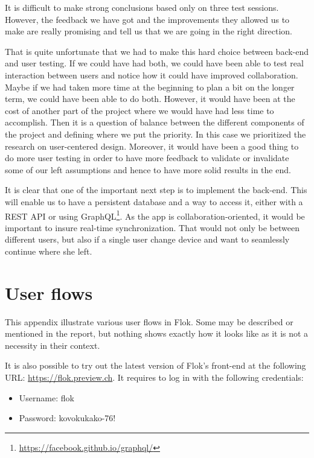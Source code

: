 \documentclass[a4paper,12pt,twoside]{article}
\begin{document}
It is difficult to make strong conclusions based only on three test sessions.
However, the feedback we have got and the improvements they allowed us to make are really promising and tell us that we are going in the right direction.


That is quite unfortunate that we had to make this hard choice between back-end and user testing.
If we could have had both, we could have been able to test real interaction between users and notice how it could have improved collaboration.
Maybe if we had taken more time at the beginning to plan a bit on the longer term, we could have been able to do both.
However, it would have been at the cost of another part of the project where we would have had less time to accomplish.
Then it is a question of balance between the different components of the project and defining where we put the priority.
In this case we prioritized the research on user-centered design.
Moreover, it would have been a good thing to do more user testing in order to have more feedback to validate or invalidate some of our left assumptions and hence to have more solid results in the end.

It is clear that one of the important next step is to implement the back-end.
This will enable us to have a persistent database and a way to access it, either with a REST API or using GraphQL\footnote{\url{https://facebook.github.io/graphql/}}.
As the app is collaboration-oriented, it would be important to insure real-time synchronization.
That would not only be between different users, but also if a single user change device and want to seamlessly continue where she left.

\cleardoublepage



\cleardoublepage
\appendix
\section{User flows}
This appendix illustrate various user flows in Flok.
Some may be described or mentioned in the report, but nothing shows exactly how it looks like as it is not a necessity in their context.

It is also possible to try out the latest version of Flok's front-end at the following URL: \url{https://flok.preview.ch}. It requires to log in with the following credentials:
\begin{itemize}
    \item Username: flok
    \item Password: kovokukako-76!
\end{itemize}
\end{document}
